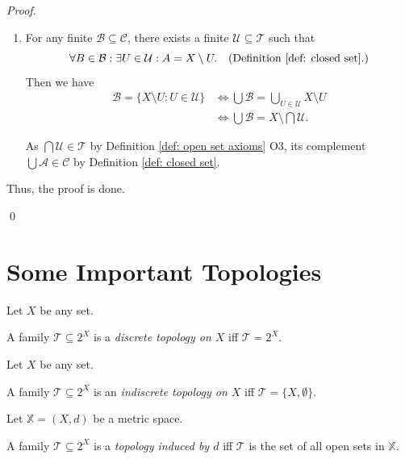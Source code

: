 \begin{theorem}
\begin{proof}
\begin{enumerate}[\bf C1.]
				\qedlm
				
			\item
			For any finite $\mathcal B \subseteq \mathcal C$, there exists a finite $\mathcal U \subseteq \mathcal T$ such that
			$$
			\forall B \in \mathcal B: \exists U \in \mathcal U: A = X \setminus U. \quad
			(\text{Definition \ref{def: closed set}}.)
			$$
			Then we have
			$$
			\begin{aligned}
				\mathcal B = \{X \setminus U : U \in \mathcal U \} &\iff \bigcup \mathcal B =  \bigcup_{U \in \mathcal U} X \setminus U \\
				&\iff \bigcup \mathcal B = X \setminus \bigcap \mathcal U.
			\end{aligned}
			$$
			
			As $\bigcap \mathcal U \in \mathcal T$ by Definition \ref{def: open set axioms} O3, its complement $\bigcup \mathcal A \in \mathcal C$ by Definition \ref{def: closed set}.
			
			\qedlm
		\end{enumerate}
		
		Thus, the proof is done.
		
		\qed
	\end{proof}
\end{theorem}


\section{Some Important Topologies}


\begin{definition}
	\label{def: discrete topology}
	Let $X$ be any set.
	
	A family $\mathcal T \subseteq 2^X$ is a \textit{discrete topology on $X$} iff $\mathcal T = 2^X$.
\end{definition}


\begin{definition}
	\label{def: indiscrete topology}
	Let $X$ be any set.
	
	A family $\mathcal T \subseteq 2^X$ is an \textit{indiscrete topology on $X$} iff $\mathcal T = \{X, \emptyset\}$.
\end{definition}


\begin{definition}
	\label{def: induced topology}
	Let $\mathbb X = (X, d)$ be a metric space.
	
	A family $\mathcal T \subseteq 2^X$ is a \textit{topology induced by $d$} iff $\mathcal T$ is the set of all open sets in $\mathbb X$.
\end{definition}


